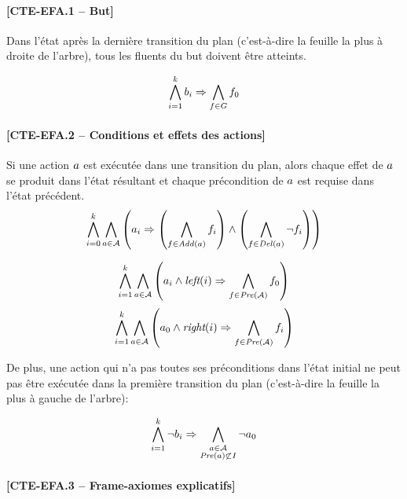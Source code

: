 \paragraph*{[CTE-EFA.1 -- But]}

Dans l'état après la dernière transition du plan (c'est-à-dire la feuille la plus à droite de l'arbre), tous les fluents du but doivent être atteints.

\[ \bigwedge\limits_{\substack{i=1}}^{k} b_{i} \Rightarrow \bigwedge\limits_{\substack{f\in G}} {f}_{0} \]	

\paragraph*{[CTE-EFA.2 -- Conditions et effets des actions]}

Si une action $a$ est exécutée dans une transition du plan, alors chaque effet de $a$ se produit dans l'état résultant et chaque précondition de $a$ est requise dans l'état précédent.
\[ \bigwedge\limits_{\substack{i=0}}^{k} \bigwedge\limits_{\substack{a \in \mathcal{A}}} \left(a_{i} \Rightarrow \left( \bigwedge\limits_{\substack{f\in \mathit{Add}(a)}} f_{i} \right) \wedge \left( \bigwedge\limits_{\substack{f\in \mathit{Del}(a)}} \neg f_{i} \right) \right) \]

\[ \bigwedge\limits_{\substack{i=1}}^{k} \bigwedge\limits_{\substack{a\in \mathcal{A}}}
\left(a_{i} \wedge \textit{left}(i) \Rightarrow \bigwedge\limits_{\substack{f \in \mathit{Pre}(\mathcal{A})}} f_{0}\right)\]
\[\bigwedge\limits_{\substack{i=1}}^{k} \bigwedge\limits_{\substack{a\in \mathcal{A}}}
\left(a_{0} \wedge \textit{right}(i) \Rightarrow \bigwedge\limits_{\substack{f \in \mathit{Pre}(\mathcal{A})}} f_{i}\right)\]

De plus, une action qui n'a pas toutes ses préconditions dans l'état initial ne peut pas être exécutée dans la première transition du plan (c'est-à-dire la feuille la plus à gauche de l'arbre):

\[ \bigwedge\limits_{\substack{i=1}}^{k}\neg b_{i} \Rightarrow \bigwedge\limits_{\substack{a\in \mathcal{A}\\ \mathit{Pre}(a) \not\subset I}} \neg {a}_{0} \]

\paragraph*{[CTE-EFA.3 -- Frame-axiomes explicatifs]}

